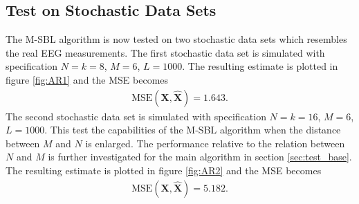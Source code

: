 \subsection{Test on Stochastic Data Sets}\label{sec:testMsbl_stoch}
The M-SBL algorithm is now tested on two stochastic data sets which resembles the real EEG measurements. 
The first stochastic data set is simulated with specification $N=k=8$, $M = 6$, $L=1000$. 
The resulting estimate is plotted in figure \ref{fig:AR1} and the MSE becomes 
\begin{align*}
\text{MSE}(\mathbf{X}, \hat{\mathbf{X}}) = 1.643.
\end{align*} 
The second stochastic data set is simulated with specification $N=k=16$, $M = 6$, $L=1000$. 
This test the capabilities of the M-SBL algorithm when the distance between $M$ and $N$ is enlarged. 
The performance relative to the relation between $N$ and $M$ is further investigated for the main algorithm in section \ref{sec:test_base}.
The resulting estimate is plotted in figure \ref{fig:AR2} and the MSE becomes 
\begin{align*}
\text{MSE}(\mathbf{X}, \hat{\mathbf{X}}) = 5.182. 
\end{align*}  
